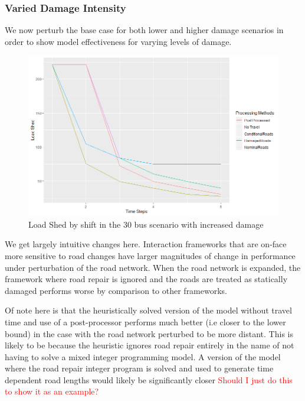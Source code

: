 \documentclass{article}
\begin{document}
	\subsubsection{Varied Damage Intensity}
	We now perturb the base case for both lower and higher damage scenarios in order to show model effectiveness for varying levels of damage.
	\begin{figure}[H]
		\centering
		\includegraphics[width=.9\linewidth]{Rplot30scenario2.png}
		\caption{Load Shed by shift in the 30 bus scenario with increased damage}
		\label{fig:sub2}
		
		
	\end{figure}
	We get largely intuitive changes here. Interaction frameworks that are on-face more sensitive to road changes have larger magnitudes of change in performance under perturbation of the road network. When the road network is expanded, the framework where road repair is ignored and the roads are treated as statically damaged performs worse by comparison to other frameworks.
	
	Of note here is that the heuristically solved version of the model without travel time and use of a post-processor performs much better (i.e closer to the lower bound) in the case with the road network perturbed to be more distant. This is likely to be because the heuristic ignores road repair entirely in the name of not having to solve a mixed integer programming model. A version of the model where the road repair integer program is solved and used to generate time dependent road lengths would likely be significantly closer \textcolor{red}{Should I just do this to show it as an example?}
	
\end{document}
